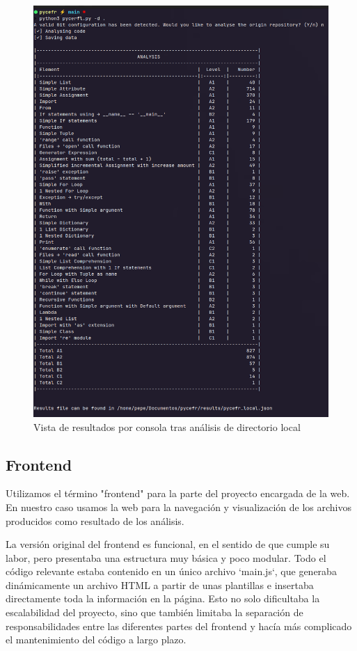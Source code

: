 \documentclass[a4paper, 12pt]{book}
\begin{document}
\begin{itemize}
\begin{figure}
  \centering
  \includegraphics[width=14cm, keepaspectratio]{img/execution_local.png}
  \caption{Vista de resultados por consola tras análisis de directorio local}
  \label{fig:execution_local}
\end{figure}
    
\end{itemize}

\subsection{Frontend}

Utilizamos el término "frontend" para la parte del proyecto encargada de la web. En nuestro caso usamos la web para la navegación y visualización de los archivos producidos como resultado de los análisis.

La versión original del frontend es funcional, en el sentido de que cumple su labor, pero presentaba una estructura muy básica y poco modular. Todo el código relevante estaba contenido en un único archivo `main.js`, que generaba dinámicamente un archivo HTML a partir de unas plantillas e insertaba directamente toda la información en la página. Esto no solo dificultaba la escalabilidad del proyecto, sino que también limitaba la separación de responsabilidades entre las diferentes partes del frontend y hacía más complicado el mantenimiento del código a largo plazo.
\end{document}
